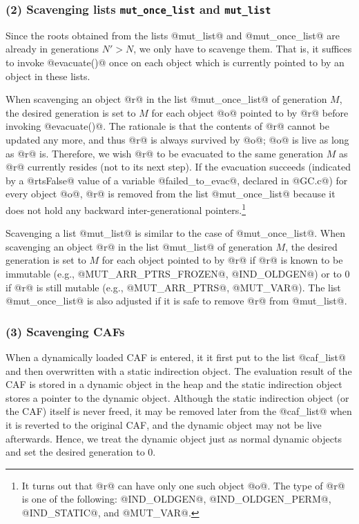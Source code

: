 \documentclass{article}
\begin{document}
\subsubsection{(2) Scavenging lists {\tt mut\_once\_list} and {\tt mut\_list}}

Since the roots obtained from the lists @mut_list@ and @mut_once_list@ are
already in generations $N' > N$, we only have to scavenge them.
That is, it suffices to invoke @evacuate()@ once on each object 
which is currently pointed to by an object in these lists. 

When scavenging an object @r@ in the list @mut_once_list@ of generation $M$,
the desired generation is set to $M$ for each object @o@ pointed
to by @r@ before invoking @evacuate()@. 
The rationale is that the contents of @r@ cannot be updated any more,
and thus @r@ is always survived by @o@; @o@ is live as long as @r@ is.
Therefore, we wish @r@ to be evacuated to the same generation $M$ as @r@
currently resides (not to its next step).
If the evacuation succeeds (indicated by a @rtsFalse@ value of a variable
@failed_to_evac@, declared in @GC.c@) for every object @o@, @r@ is removed 
from the list @mut_once_list@ because it does not hold any backward 
inter-generational pointers.\footnote{It turns out that @r@ can have only
one such object @o@. The type of @r@ is one of the following:
@IND\_OLDGEN@, @IND\_OLDGEN\_PERM@, @IND\_STATIC@, and @MUT\_VAR@.}

Scavenging a list @mut_list@ is similar to the case of @mut_once_list@.
When scavenging an object @r@ in the list @mut_list@ of generation $M$,
the desired generation is set to $M$ for each object pointed to by @r@
if @r@ is known to be immutable (e.g., @MUT_ARR_PTRS_FROZEN@, 
@IND_OLDGEN@)
or to $0$ if @r@ is still mutable (e.g., @MUT_ARR_PTRS@, @MUT_VAR@).
The list @mut_once_list@ is also adjusted if it is safe to remove @r@ from
@mut_list@. 

\subsubsection{(3) Scavenging CAFs}

When a dynamically loaded CAF is entered, it it first put to the list 
@caf_list@ and then overwritten with a static indirection object.
The evaluation result of the CAF is stored in a dynamic object in the heap
and the static indirection object stores a pointer to the dynamic object.
Although the static indirection object (or the CAF) itself is never freed, 
it may be removed later from the @caf_list@ when it is reverted to the 
original CAF, and the dynamic object may not be live afterwards.
Hence, we treat the dynamic object just as normal dynamic objects and
set the desired generation to $0$.
\end{document}

